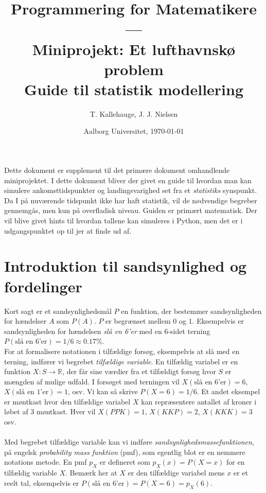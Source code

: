 \documentclass{article}
\title{Programmering for Matematikere 
\\ ---\\
Miniprojekt: Et lufthavnskø problem \\
\large Guide til statistik modellering}
\date{Aalborg Universitet, \today}
\author{T. Kallehauge, J. J. Nielsen}
\newcommand{\mR}{\mathbb{R}}
\begin{document}
\maketitle
\newpage
Dette dokument er supplement til det primære dokument omhandlende miniprojektet. I dette dokument bliver der givet en guide til hvordan man kan simulere ankomsttidspunkter og landingsvarighed set fra et \textit{statistiks} synspunkt. Da I på nuværende tidspunkt ikke har haft statistik, vil de nødvendige begreber gennemgås, men kun på overfladisk niveau. Guiden er primært matematisk. Der vil blive givet hints til hvordan tallene kan simuleres i Python, men det er i udgangspunktet op til jer at finde ud af. 
\section{Introduktion til sandsynlighed og fordelinger}
Kort sagt er et sandsynlighedsmål $P$ en funktion, der bestemmer sandsynligheden for hændelser $A$ som $P(A)$. $P$ er begrænset mellem $0$ og $1$. Eksempelvis er sandsynligheden for hændelsen \textit{slå en 6'er} med en 6-sidet terning $P(\text{slå en 6'er}) = 1/6 \approx 0.17\%$. \\
For at formalisere notationen i tilfældige forsøg,  eksempelvis at slå med en terning, indfører vi begrebet \textit{tilfældige variable}. En tilfældig variabel er en funktion $X: S \to\mR$, der får sine værdier fra et tilfældigt forsøg hvor $S$ er mængden af mulige udfald. I forsøget med terningen vil $X(\text{slå en 6'er}) = 6$, $X(\text{slå en 1'er}) = 1$, osv. Vi kan så skrive $P(X = 6) = 1/6$. Et andet eksempel er møntkast hvor den tilfældige variabel $X$ kan repræsentere antallet af kroner i løbet af 3 møntkast. Hver vil $X(PPK) = 1$, $X(KKP) = 2$, $X(KKK) = 3$ osv.
\\ \\
Med begrebet tilfældige variable kan vi indføre \textit{sandsynlighedsmassefunktionen}, på engelsk \textit{probability mass funktion} (pmf), som egentlig blot er en nemmere notations metode. En pmf $p_X$ er defineret som $p_X(x) = P(X = x)$ for en tilfældig variable $X$. Bemærk her at $X$ er den tilfældige variabel mens $x$ er et reelt tal, eksempelvis er $P(\text{slå en 6'er}) = P(X = 6) = p_X(6)$. 
\\ \\ 
\end{document}
